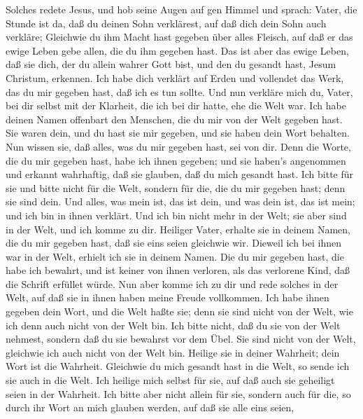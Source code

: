  Solches redete Jesus, und hob seine Augen auf gen Himmel
und sprach: Vater, die Stunde ist da, daß du deinen Sohn verklärest, auf
daß dich dein Sohn auch verkläre;  Gleichwie du ihm Macht
hast gegeben über alles Fleisch, auf daß er das ewige Leben gebe allen,
die du ihm gegeben hast.  Das ist aber das ewige Leben, daß
sie dich, der du allein wahrer Gott bist, und den du gesandt hast, Jesum
Christum, erkennen.  Ich habe dich verklärt auf Erden und
vollendet das Werk, das du mir gegeben hast, daß ich es tun sollte.
 Und nun verkläre mich du, Vater, bei dir selbst mit der
Klarheit, die ich bei dir hatte, ehe die Welt war.  Ich habe
deinen Namen offenbart den Menschen, die du mir von der Welt gegeben
hast. Sie waren dein, und du hast sie mir gegeben, und sie haben dein
Wort behalten.  Nun wissen sie, daß alles, was du mir
gegeben hast, sei von dir.  Denn die Worte, die du mir
gegeben hast, habe ich ihnen gegeben; und sie haben's angenommen und
erkannt wahrhaftig, daß sie glauben, daß du mich gesandt hast.
 Ich bitte für sie und bitte nicht für die Welt, sondern für
die, die du mir gegeben hast; denn sie sind dein.  Und
alles, was mein ist, das ist dein, und was dein ist, das ist mein; und
ich bin in ihnen verklärt.  Und ich bin nicht mehr in der
Welt; sie aber sind in der Welt, und ich komme zu dir. Heiliger Vater,
erhalte sie in deinem Namen, die du mir gegeben hast, daß sie eins seien
gleichwie wir.  Dieweil ich bei ihnen war in der Welt,
erhielt ich sie in deinem Namen. Die du mir gegeben hast, die habe ich
bewahrt, und ist keiner von ihnen verloren, als das verlorene Kind, daß
die Schrift erfüllet würde.  Nun aber komme ich zu dir und
rede solches in der Welt, auf daß sie in ihnen haben meine Freude
vollkommen.  Ich habe ihnen gegeben dein Wort, und die Welt
haßte sie; denn sie sind nicht von der Welt, wie ich denn auch nicht von
der Welt bin.  Ich bitte nicht, daß du sie von der Welt
nehmest, sondern daß du sie bewahrst vor dem Übel.  Sie
sind nicht von der Welt, gleichwie ich auch nicht von der Welt bin.
 Heilige sie in deiner Wahrheit; dein Wort ist die
Wahrheit.  Gleichwie du mich gesandt hast in die Welt, so
sende ich sie auch in die Welt.  Ich heilige mich selbst
für sie, auf daß auch sie geheiligt seien in der Wahrheit. 
Ich bitte aber nicht allein für sie, sondern auch für die, so durch ihr
Wort an mich glauben werden,  auf daß sie alle eins seien,
